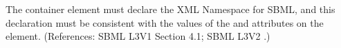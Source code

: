 The  container element must declare the XML Namespace
for SBML, and this declaration must be consistent with the values
of the  and  attributes on the 
 element.  (References: SBML L3V1 Section 4.1; SBML
L3V2 .)
